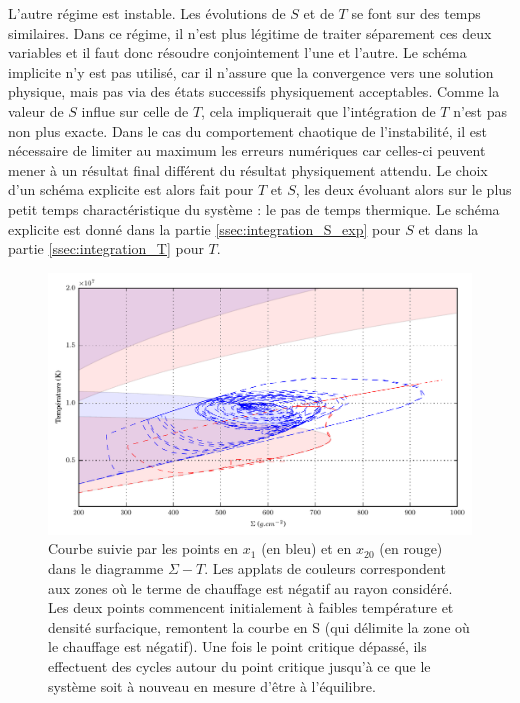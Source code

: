 L'autre régime est instable. Les évolutions de $S$ et de $T$ se font sur des temps similaires. Dans ce régime, il n'est plus légitime de traiter séparement ces deux variables et il faut donc résoudre conjointement l'une et l'autre. Le schéma implicite n'y est pas utilisé, car il n'assure que la convergence vers une solution physique, mais pas via des états successifs physiquement acceptables. Comme la valeur de $S$ influe sur celle de $T$, cela impliquerait que l'intégration de $T$ n'est pas non plus exacte. Dans le cas du comportement chaotique de l'instabilité, il est nécessaire de limiter au maximum les erreurs numériques car celles-ci peuvent mener à un résultat final différent du résultat physiquement attendu. Le choix d'un schéma explicite est alors fait pour $T$ et $S$, les deux évoluant alors sur le plus petit temps charactéristique du système : le pas de temps thermique. Le schéma explicite est donné dans la partie \ref{ssec:integration_S_exp} pour $S$ et dans la partie \ref{ssec:integration_T} pour $T$.

\begin{figure}
  \includegraphics{figures/S-T.pdf}
  \caption{Courbe suivie par les points en $x_1$ (en bleu) et en $x_{20}$ (en rouge) dans le diagramme $\Sigma-T$. Les applats de couleurs correspondent aux zones où le terme de chauffage est négatif au rayon considéré. Les deux points commencent initialement à faibles température et densité surfacique, remontent la courbe en S (qui délimite la zone où le chauffage est négatif). Une fois le point critique dépassé, ils effectuent des cycles autour du point critique jusqu'à ce que le système soit à nouveau en mesure d'être à l'équilibre. }
\end{figure}

